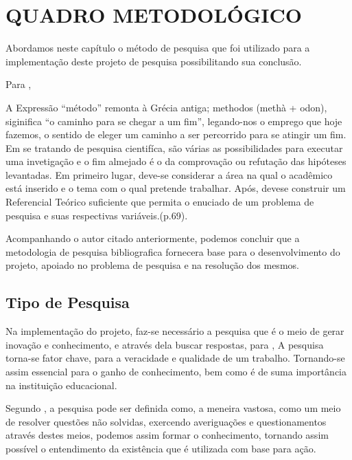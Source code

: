 
\chapter{QUADRO METODOLÓGICO}


\par Abordamos neste capítulo o método de pesquisa que foi utilizado para a
implementação deste projeto de pesquisa possibilitando sua conclusão.

\par Para ,

\begin{citacao}
	A Expressão “método” remonta à Grécia antiga; methodos (methà + odon),
	siginifica “o caminho para se chegar a um fim”, legando-nos o emprego que
	hoje fazemos, o sentido de eleger um caminho a ser percorrido para se atingir
	um fim. Em se tratando de pesquisa cientifíca, são várias as possibilidades
	para executar uma invetigação e o fim almejado é o da comprovação ou refutação
	das hipóteses levantadas. Em primeiro lugar, deve-se considerar a área na qual
	o acadêmico está inserido e o tema com o qual pretende trabalhar. Após, devese
	construir um Referencial Teórico suficiente que permita o enuciado de um
	problema de pesquisa e suas respectivas variáveis.(p.69). 
\end{citacao}

\par Acompanhando o autor citado anteriormente, podemos concluir que a metodologia de
pesquisa bibliografica fornecera base para o desenvolvimento do projeto, apoiado no problema
de pesquisa e na resolução dos mesmos.

\section{Tipo de Pesquisa}

\par Na implementação do projeto, faz-se necessário a pesquisa que é o meio de 
gerar inovação e conhecimento, e através dela buscar respostas, para 
, A pesquisa torna-se fator chave, para a
veracidade e qualidade de um trabalho. Tornando-se assim essencial para o ganho
de conhecimento, bem como é de suma importância na instituição educacional.
  
\par Segundo , a pesquisa pode ser definida como, a
meneira vastosa, como um meio de resolver questões não solvidas, exercendo averiguações e questionamentos através
destes meios, podemos assim formar o conhecimento, tornando assim possível o entendimento
da existência que é utilizada com base para ação.

